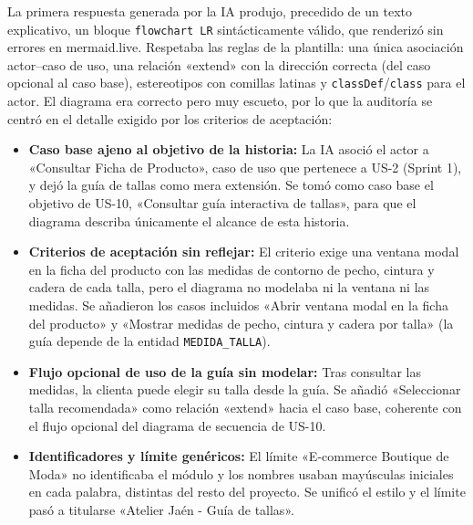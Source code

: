 La primera respuesta generada por la IA produjo, precedido de un texto explicativo, un bloque \texttt{flowchart LR} sintácticamente válido, que renderizó sin errores en mermaid.live. Respetaba las reglas de la plantilla: una única asociación actor--caso de uso, una relación «extend» con la dirección correcta (del caso opcional al caso base), estereotipos con comillas latinas y \texttt{classDef}/\texttt{class} para el actor. El diagrama era correcto pero muy escueto, por lo que la auditoría se centró en el detalle exigido por los criterios de aceptación:
\begin{itemize}[leftmargin=*,nosep]
\item \textbf{Caso base ajeno al objetivo de la historia:} La IA asoció el actor a «Consultar Ficha de Producto», caso de uso que pertenece a US-2 (Sprint 1), y dejó la guía de tallas como mera extensión. Se tomó como caso base el objetivo de US-10, «Consultar guía interactiva de tallas», para que el diagrama describa únicamente el alcance de esta historia.
\item \textbf{Criterios de aceptación sin reflejar:} El criterio exige una ventana modal en la ficha del producto con las medidas de contorno de pecho, cintura y cadera de cada talla, pero el diagrama no modelaba ni la ventana ni las medidas. Se añadieron los casos incluidos «Abrir ventana modal en la ficha del producto» y «Mostrar medidas de pecho, cintura y cadera por talla» (la guía depende de la entidad \texttt{MEDIDA\_TALLA}).
\item \textbf{Flujo opcional de uso de la guía sin modelar:} Tras consultar las medidas, la clienta puede elegir su talla desde la guía. Se añadió «Seleccionar talla recomendada» como relación «extend» hacia el caso base, coherente con el flujo opcional del diagrama de secuencia de US-10.
\item \textbf{Identificadores y límite genéricos:} El límite «E-commerce Boutique de Moda» no identificaba el módulo y los nombres usaban mayúsculas iniciales en cada palabra, distintas del resto del proyecto. Se unificó el estilo y el límite pasó a titularse «Atelier Jaén - Guía de tallas».
\end{itemize}
